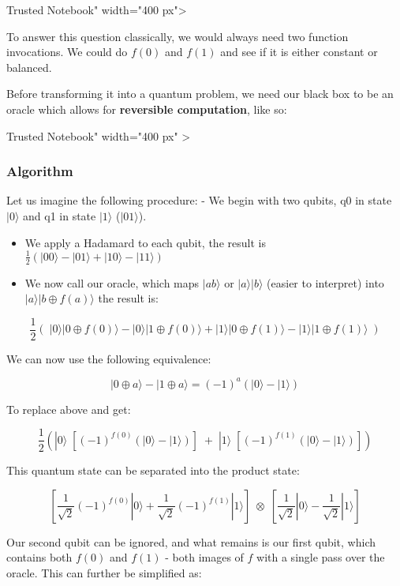 \documentclass[11pt]{article}
\begin{document}
 Trusted Notebook" width="400 px"\textgreater{}

To answer this question classically, we would always need two function
invocations. We could do \(f(0)\) and \(f(1)\) and see if it is either
constant or balanced.

    Before transforming it into a quantum problem, we need our black box to
be an oracle which allows for \textbf{reversible computation}, like so:

 Trusted Notebook" width="400 px" \textgreater{}

    \subsubsection{Algorithm}\label{algorithm}

Let us imagine the following procedure: - We begin with two qubits, q0
in state \(|0\rangle\) and q1 in state \(|1\rangle\) (\(|01\rangle\)).

\begin{itemize}
\item
  We apply a Hadamard to each qubit, the result is
  \(\frac{1}{2}(|00\rangle - |01\rangle + |10\rangle - |11\rangle)\)
\item
  We now call our oracle, which maps \(|ab\rangle\) or
  \(|a\rangle |b\rangle\) (easier to interpret) into
  \(|a\rangle |b \oplus f(a)\rangle\) the result is:
\end{itemize}

\[\frac{1}{2}( \; |0\rangle |0\oplus f(0)\rangle - |0\rangle |1\oplus f(0)\rangle + |1\rangle |0\oplus f(1)\rangle - |1 \rangle |1\oplus f(1)\rangle \;)\]

    We can now use the following equivalence:

\[|0 \oplus a\rangle - |1 \oplus a\rangle =  (-1)^a(|0\rangle - |1\rangle)\]

To replace above and get:

\[\frac{1}{2}(|0\rangle \; [(-1)^{f(0)}(|0\rangle - |1\rangle)]\; +\; |1\rangle \;[(-1)^{f(1)}(|0\rangle - |1\rangle)])\]

This quantum state can be separated into the product state:

\[ [\frac{1}{\sqrt{2}} (-1)^{f(0)} | 0 \rangle + \frac{1}{\sqrt{2}} (-1)^{f(1)}| 1 \rangle] \; \otimes \; [\frac{1}{\sqrt{2}} | 0 \rangle - \frac{1}{\sqrt{2}} | 1 \rangle] \]

Our second qubit can be ignored, and what remains is our first qubit,
which contains both \(f(0)\) and \(f(1)\) - both images of \(f\) with a
single pass over the oracle. This can further be simplified as:
\end{document}
